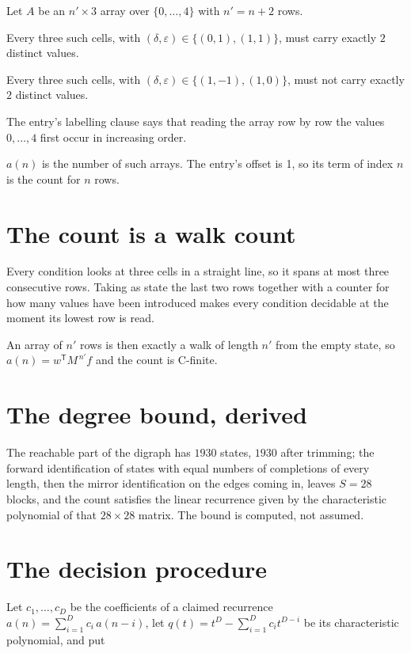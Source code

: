 \documentclass[11pt]{article}
\theoremstyle{definition}
\begin{document}
Let $A$ be an $n' \times 3$ array over $\{0,\dots,4\}$ with $n' = n + 2$ rows.

Every three such cells, with $(\delta,\varepsilon) \in \{(0,1), (1,1)\}$, must carry exactly $2$ distinct values.

Every three such cells, with $(\delta,\varepsilon) \in \{(1,-1), (1,0)\}$, must not carry exactly $2$ distinct values.

The entry's labelling clause says that reading the array row by row the values $0,\dots,4$ first occur in increasing order.

$a(n)$ is the number of such arrays. The entry's offset is 1, so its term of index $n$ is the count for $n$ rows.

\section{The count is a walk count}

Every condition looks at three cells in a straight line, so it spans at most three consecutive rows. Taking as state the last two rows together with a counter for how many values have been introduced makes every condition decidable at the moment its lowest row is read.

An array of $n'$ rows is then exactly a walk of length $n'$ from the empty state, so $a(n) = w^{\mathsf T}M^{\,n'}f$ and the count is C-finite.

\section{The degree bound, derived}

The reachable part of the digraph has $1930$ states, $1930$ after trimming; the forward identification of states with equal numbers of completions of every length, then the mirror identification on the edges coming in, leaves $S = 28$ blocks, and the count satisfies the linear recurrence given by the characteristic polynomial of that $28\times28$ matrix. The bound is computed, not assumed.

\section{The decision procedure}

Let $c_1,\dots,c_D$ be the coefficients of a claimed recurrence $a(n) = \sum_{i=1}^{D} c_i\,a(n-i)$, let $q(t) = t^{D} - \sum_{i=1}^{D} c_i t^{D-i}$ be its characteristic polynomial, and put
\end{document}
